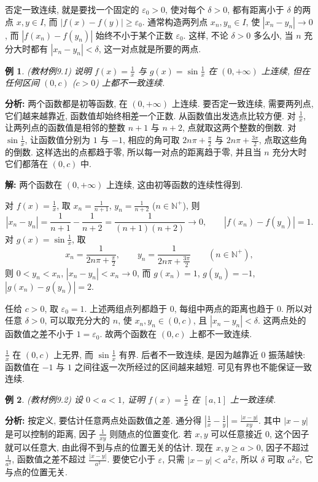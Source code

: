 \documentclass[UTF8,openany]{ctexbook}
\theoremstyle{chinesetextbook}
\newtheorem{example}{例}[section]
\newenvironment{cnsolution}{\par\indent\textbf{解:} \ignorespaces}{\par}
\begin{document}
否定一致连续, 就是要找一个固定的 $\varepsilon_0>0$, 使对每个 $\delta>0$, 都有距离小于 $\delta$ 的两点 $x,y\in I$, 而 $|f(x)-f(y)|\ge\varepsilon_0$. 通常构造两列点 $x_n,y_n\in I$, 使 $|x_n-y_n|\to0$, 而 $|f(x_n)-f(y_n)|$ 始终不小于某个正数 $\varepsilon_0$. 这样, 不论 $\delta>0$ 多么小, 当 $n$ 充分大时都有 $|x_n-y_n|<\delta$, 这一对点就是所要的两点.
\begin{example}\label{ex:9-1}
\textnormal{(教材例9.1)} 说明 $\displaystyle f(x)=\frac1x$ 与 $\displaystyle g(x)=\sin\frac1x$ 在 $(0,+\infty)$ 上连续, 但在任何区间 $(0,c)$ ($c>0$) 上都不一致连续.
\end{example}
\par\indent\textbf{分析:} 两个函数都是初等函数, 在 $(0,+\infty)$ 上连续. 要否定一致连续, 需要两列点, 它们越来越靠近, 函数值却始终相差一个正数. 从函数值出发选点比较方便. 对 $\displaystyle\frac1x$, 让两列点的函数值是相邻的整数 $n+1$ 与 $n+2$, 点就取这两个整数的倒数. 对 $\displaystyle\sin\frac1x$, 让函数值分别为 $1$ 与 $-1$, 相应的角可取 $\displaystyle2n\pi+\frac\pi2$ 与 $\displaystyle2n\pi+\frac{3\pi}2$, 点取这些角的倒数. 这样选出的点都趋于零, 所以每一对点的距离趋于零, 并且当 $n$ 充分大时它们都落在 $(0,c)$ 中.
\begin{cnsolution}
两个函数在 $(0,+\infty)$ 上连续, 这由初等函数的连续性得到.

对 $\displaystyle f(x)=\frac1x$, 取 $\displaystyle x_n=\frac1{n+1}$, $\displaystyle y_n=\frac1{n+2}$ ($n\in\mathbb N^+$), 则
\[
|x_n-y_n|=\frac1{n+1}-\frac1{n+2}=\frac1{(n+1)(n+2)}\to0,\qquad|f(x_n)-f(y_n)|=1.
\]
对 $\displaystyle g(x)=\sin\frac1x$, 取
\[
x_n=\frac1{2n\pi+\frac\pi2},\qquad y_n=\frac1{2n\pi+\frac{3\pi}2}\qquad(n\in\mathbb N^+),
\]
则 $0<y_n<x_n$, $|x_n-y_n|<x_n\to0$, 而 $g(x_n)=1$, $g(y_n)=-1$, $|g(x_n)-g(y_n)|=2$.

任给 $c>0$, 取 $\varepsilon_0=1$. 上述两组点列都趋于 $0$, 每组中两点的距离也趋于 $0$. 所以对任意 $\delta>0$, 可以取充分大的 $n$, 使 $x_n,y_n\in(0,c)$, 且 $|x_n-y_n|<\delta$. 这两点处的函数值之差不小于 $1=\varepsilon_0$. 故两个函数在 $(0,c)$ 上都不一致连续.
\end{cnsolution}
$\displaystyle\frac1x$ 在 $(0,c)$ 上无界, 而 $\displaystyle\sin\frac1x$ 有界. 后者不一致连续, 是因为越靠近 $0$ 振荡越快: 函数值在 $-1$ 与 $1$ 之间往返一次所经过的区间越来越短. 可见有界也不能保证一致连续.
\begin{example}
\textnormal{(教材例9.2)} 设 $0<a<1$, 证明 $\displaystyle f(x)=\frac1x$ 在 $[a,1]$ 上一致连续.
\end{example}
\par\indent\textbf{分析:} 按定义, 要估计任意两点处函数值之差. 通分得 $\displaystyle\left|\frac1x-\frac1y\right|=\frac{|x-y|}{xy}$. 其中 $|x-y|$ 是可以控制的距离, 因子 $\displaystyle\frac1{xy}$ 则随点的位置变化. 若 $x,y$ 可以任意接近 $0$, 这个因子就可以任意大, 由此得不到与点的位置无关的估计. 现在 $x,y\ge a>0$, 因子不超过 $\displaystyle\frac1{a^2}$, 函数值之差不超过 $\displaystyle\frac{|x-y|}{a^2}$. 要使它小于 $\varepsilon$, 只需 $|x-y|<a^2\varepsilon$, 所以 $\delta$ 可取 $a^2\varepsilon$, 它与点的位置无关.
\end{document}
